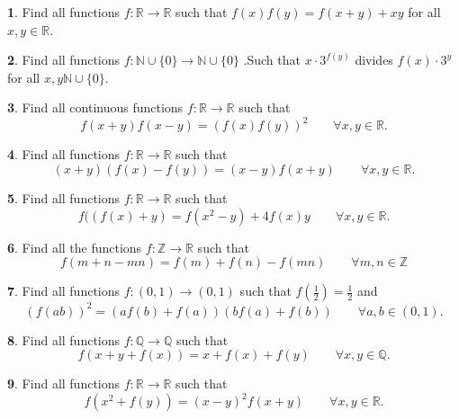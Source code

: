 \documentclass{article}
\newcommand{\plus}{+}
\newcommand{\minus}{-}
\newcommand{\equal}{=}
\theoremstyle{definition}
\newtheorem{p}{}
\begin{document}
\begin{p}
Find all functions $ f: \mathbb R\to \mathbb R$ such that $ f(x)f(y)=f(x+y)+xy$ for all $ x,y\in \mathbb R$.
\end{p}


\begin{p}
Find all functions $ f: \mathbb N \cup \{0\}\to \mathbb N \cup \{0\}$ .Such that $x \cdot 3^{f(y)}$ divides $ f(x)\cdot 3^{y}$ for all $ x,y \mathbb N \cup \{0\}$.
\end{p}



\begin{p}
Find all continuous functions $ f: \mathbb{R} \to \mathbb{R}$ such that
\[f(x+y)f(x-y)=(f(x)f(y))^2 \qquad \forall x,y \in \mathbb R.\]
\end{p}



\begin{p}
Find all functions $ f: \mathbb R \to \mathbb R$ such that
\[(x+y)(f(x)-f(y))=(x-y)f(x+y) \qquad \forall x,y \in \mathbb R.\]
\end{p}


\begin{p}
Find all functions $ f: \mathbb R \to \mathbb R$ such that
\[f((f(x)+y)=f(x^{2}-y)+4f(x)y \qquad \forall x,y \in \mathbb R.\]
\end{p}


\begin{p}
Find all the functions $ f: \mathbb{Z}\to \mathbb{R}$ such that
\[ f(m+n-mn)=f(m)+f(n)-f(mn) \qquad \forall m,n\in \mathbb{Z}\]
\end{p}



\begin{p}
Find all functions $ f: (0,1)\rightarrow(0,1)$ such that $ f(\frac{1}{2})=\frac{1}{2}$ and
\[\left(f(ab)\right)^{2}=\left(af(b)+f(a)\right)\left(bf(a)+f(b)\right) \qquad \forall a,b \in (0,1).\]
\end{p}



\begin{p}
Find all functions $ f: \mathbb Q \to \mathbb Q$ such that
\[f\left(x+y+f\left(x\right)\right) = x+f\left(x\right)+f\left(y\right) \qquad \forall x,y \in \mathbb Q.\]
\end{p}



\begin{p}
Find all functions $ f: \mathbb R \to \mathbb R$ such that 
\[f(x^2\plus{}f(y))\equal{}(x\minus{}y)^2f(x\plus{}y) \qquad \forall x,y \in \mathbb R.\]
\end{p}
\end{document}

